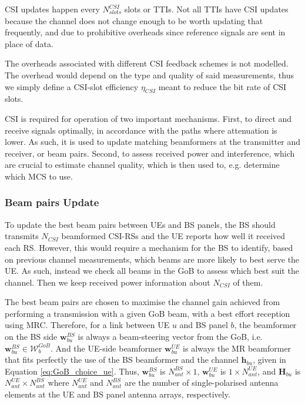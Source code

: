 CSI updates happen every $N^{CSI}_{slots}$ slots or \acsp{TTI}. Not all TTIs have CSI updates because the channel does not change enough to be worth updating that frequently, and due to prohibitive overheads since reference signals are sent in place of data. 

The overheads associated with different \ac{CSI} feedback schemes is not modelled. The overhead would depend on the type and quality of said measurements, thus we simply define a CSI-slot efficiency $\eta_{CSI}$ meant to reduce the bit rate of CSI slots.

CSI is required for operation of two important mechanisms. First, to direct and receive signals optimally, in accordance with the paths where attenuation is lower. As such, it is used to update matching beamformers at the transmitter and receiver, or beam pairs. Second, to assess received power and interference, which are crucial to estimate channel quality, which is then used to, e.g. determine which MCS to use.


\subsubsection*{Beam pairs Update}

To update the best beam pairs between UEs and BS panels, the BS should transmits $N_{CSI}$ beamformed CSI-RSs and the UE reports how well it received each RS. However, this would require a mechanism for the BS to identify, based on previous channel measurements, which beams are more likely to best serve the UE. As such, instead we check all beams in the \ac{GoB} to assess which best suit the channel. Then we keep received power information about $N_{CSI}$ of them.

The best beam pairs are chosen to maximise the channel gain achieved from performing a transmission with a given GoB beam, with a best effort reception using \acs{MRC}. Therefore, for a link between UE $u$ and BS panel $b$, the beamformer on the BS side $\bm{w}^{BS}_{bu}$ is always a beam-steering vector from the GoB, i.e. $\bm{w}^{BS}_{bu} \in \mathcal{W}^{GoB}_b$. And the UE-side beamformer $\bm{w}^{UE}_{bu}$ is always the \ac{MR} beamformer that fits perfectly the use of the BS beamformer and the channel $\bm{h}_{bu}$, given in Equation \ref{eq:GoB_choice_ue}. Thus, $\bm{w}^{BS}_{bu}$ is $N_{ant}^{BS} \times 1$, $\bm{w}^{UE}_{bu}$ is $1 \times N_{ant}^{UE}$, and $\bm{H}_{bu}$ is $N_{ant}^{UE} \times N_{ant}^{BS}$ where $N_{ant}^{UE}$ and $N_{ant}^{BS}$ are the number of single-polarised antenna elements at the UE and BS panel antenna arrays, respectively.


